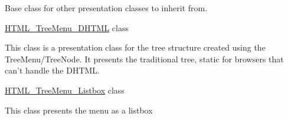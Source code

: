 \-Base class for other presentation classes to inherit from.

\hyperlink{class_h_t_m_l___tree_menu___d_h_t_m_l}{\-H\-T\-M\-L\-\_\-\-Tree\-Menu\-\_\-\-D\-H\-T\-M\-L} class

\-This class is a presentation class for the tree structure created using the \-Tree\-Menu/\-Tree\-Node. \-It presents the traditional tree, static for browsers that can't handle the \-D\-H\-T\-M\-L.

\hyperlink{class_h_t_m_l___tree_menu___listbox}{\-H\-T\-M\-L\-\_\-\-Tree\-Menu\-\_\-\-Listbox} class

\-This class presents the menu as a listbox 